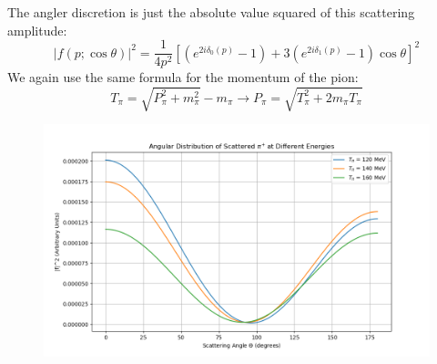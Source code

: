 \documentclass[12pt]{article}
\begin{document}
The angler discretion is just the absolute value squared of this scattering amplitude:
\begin{equation}
|f(p ; \cos \theta)|^2 = \frac{1}{4 p^2} \left[\left(e^{2 i \delta_{0}(p)}-1\right) + 3\left(e^{2 i \delta_{1}(p)}-1\right) \cos \theta\right]^2
\end{equation}
We again use the same formula for the momentum of the pion:
\begin{equation}
T_{\pi}=\sqrt{P_{\pi}^{2}+m_{\pi}^{2}}-m_{\pi} \rightarrow P_{\pi}=\sqrt{T_{\pi}^{2}+2m_{\pi}T_{\pi}}
\end{equation}
\begin{figure}
  \centering
  \includegraphics[max width=\textwidth]{angular_distribution.png}
\end{figure}
\end{document}
